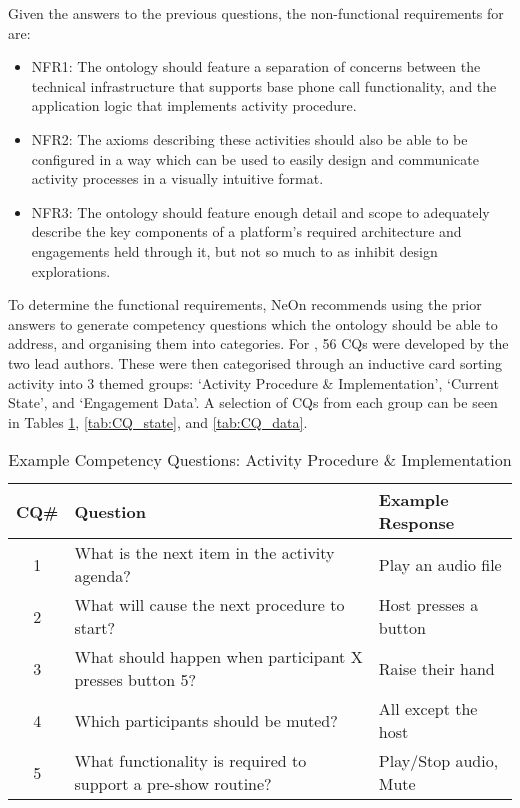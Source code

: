 Given the answers to the previous questions, the non-functional requirements for \ONT{} are:

\begin{itemize}
    \item NFR1: The ontology should feature a separation of concerns between the technical infrastructure that supports base phone call functionality, and the application logic that implements activity procedure.
    \item NFR2: The axioms describing these activities should also be able to be configured in a way which can be used to easily design and communicate activity processes in a visually intuitive format.
    \item NFR3: The ontology should feature enough detail and scope to adequately describe the key components of a platform's required architecture and engagements held through it, but not so much to as inhibit design explorations.
\end{itemize}

To determine the functional requirements, NeOn recommends using the prior answers to generate competency questions which the ontology should be able to address, and organising them into categories. For \ONT{}, 56 CQs were developed by the two lead authors. These were then categorised through an inductive card sorting activity into 3 themed groups: `Activity Procedure \& Implementation', `Current State', and `Engagement Data'. A selection of CQs from each group can be seen in Tables \ref{tab:CQ_activity}, \ref{tab:CQ_state}, and \ref{tab:CQ_data}.

\begin{table}
  \caption{Example Competency Questions: Activity Procedure \& Implementation}
  \label{tab:CQ_activity}
  \begin{tabular}{cll}
    \toprule
    CQ\#&Question&Example Response\\
    \midrule
    1&What is the next item in the activity agenda?&Play an audio file\\
    2&What will cause the next procedure to start?&Host presses a button\\
    3&What should happen when participant X presses button 5?&Raise their hand\\
    4&Which participants should be muted?&All except the host\\
    5&What functionality is required to support a pre-show routine?&Play/Stop audio, Mute\\
  \bottomrule
\end{tabular}
\end{table}

